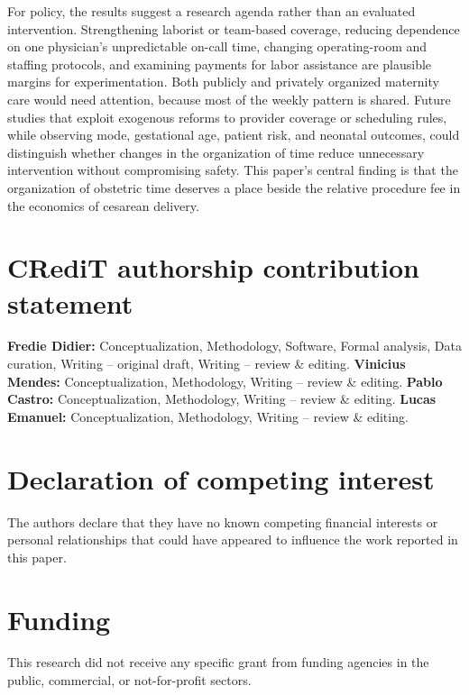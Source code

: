 \documentclass[12pt]{article}
\begin{document}
For policy, the results suggest a research agenda rather than an evaluated intervention. Strengthening laborist or team-based coverage, reducing dependence on one physician's unpredictable on-call time, changing operating-room and staffing protocols, and examining payments for labor assistance are plausible margins for experimentation. Both publicly and privately organized maternity care would need attention, because most of the weekly pattern is shared. Future studies that exploit exogenous reforms to provider coverage or scheduling rules, while observing mode, gestational age, patient risk, and neonatal outcomes, could distinguish whether changes in the organization of time reduce unnecessary intervention without compromising safety. This paper's central finding is that the organization of obstetric time deserves a place beside the relative procedure fee in the economics of cesarean delivery.

\section*{CRediT authorship contribution statement}
\textbf{Fredie Didier:} Conceptualization, Methodology, Software, Formal
analysis, Data curation, Writing -- original draft, Writing -- review \&
editing. \textbf{Vinicius Mendes:} Conceptualization, Methodology, Writing --
review \& editing. \textbf{Pablo Castro:} Conceptualization, Methodology,
Writing -- review \& editing. \textbf{Lucas Emanuel:} Conceptualization,
Methodology, Writing -- review \& editing.

\section*{Declaration of competing interest}
The authors declare that they have no known competing financial interests or
personal relationships that could have appeared to influence the work reported
in this paper.

\section*{Funding}
This research did not receive any specific grant from funding agencies in the
public, commercial, or not-for-profit sectors.
\end{document}
